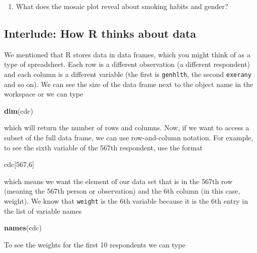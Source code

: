\documentclass[]{article}
\newenvironment{Shaded}{\begin{snugshade}}{\end{snugshade}}
\newcommand{\KeywordTok}[1]{\textcolor[rgb]{0.13,0.29,0.53}{\textbf{{#1}}}}
\newcommand{\DecValTok}[1]{\textcolor[rgb]{0.00,0.00,0.81}{{#1}}}
\newcommand{\NormalTok}[1]{{#1}}
\begin{document}
\begin{enumerate}
\def\labelenumi{\arabic{enumi}.}
\setcounter{enumi}{2}
\itemsep1pt\parskip0pt
\item
  What does the mosaic plot reveal about smoking habits and gender?
\end{enumerate}

\subsection{Interlude: How R thinks about
data}\label{interlude-how-r-thinks-about-data}

We mentioned that R stores data in data frames, which you might think of
as a type of spreadsheet. Each row is a different observation (a
different respondent) and each column is a different variable (the first
is \texttt{genhlth}, the second \texttt{exerany} and so on). We can see
the size of the data frame next to the object name in the workspace or
we can type

\begin{Shaded}
\begin{Highlighting}[]
\KeywordTok{dim}\NormalTok{(cdc)}
\end{Highlighting}
\end{Shaded}

which will return the number of rows and columns. Now, if we want to
access a subset of the full data frame, we can use row-and-column
notation. For example, to see the sixth variable of the 567th
respondent, use the format

\begin{Shaded}
\begin{Highlighting}[]
\NormalTok{cdc[}\DecValTok{567}\NormalTok{,}\DecValTok{6}\NormalTok{]}
\end{Highlighting}
\end{Shaded}

which means we want the element of our data set that is in the 567th row
(meaning the 567th person or observation) and the 6th column (in this
case, weight). We know that \texttt{weight} is the 6th variable because
it is the 6th entry in the list of variable names

\begin{Shaded}
\begin{Highlighting}[]
\KeywordTok{names}\NormalTok{(cdc)}
\end{Highlighting}
\end{Shaded}

To see the weights for the first 10 respondents we can type
\end{document}

